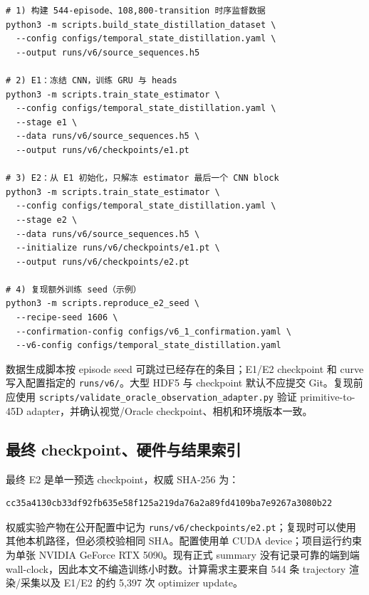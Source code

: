 \begin{Verbatim}[breaklines=true,breakanywhere=true,fontsize=\small]
# 1) 构建 544-episode、108,800-transition 时序监督数据
python3 -m scripts.build_state_distillation_dataset \
  --config configs/temporal_state_distillation.yaml \
  --output runs/v6/source_sequences.h5

# 2) E1：冻结 CNN，训练 GRU 与 heads
python3 -m scripts.train_state_estimator \
  --config configs/temporal_state_distillation.yaml \
  --stage e1 \
  --data runs/v6/source_sequences.h5 \
  --output runs/v6/checkpoints/e1.pt

# 3) E2：从 E1 初始化，只解冻 estimator 最后一个 CNN block
python3 -m scripts.train_state_estimator \
  --config configs/temporal_state_distillation.yaml \
  --stage e2 \
  --data runs/v6/source_sequences.h5 \
  --initialize runs/v6/checkpoints/e1.pt \
  --output runs/v6/checkpoints/e2.pt

# 4) 复现额外训练 seed（示例）
python3 -m scripts.reproduce_e2_seed \
  --recipe-seed 1606 \
  --confirmation-config configs/v6_1_confirmation.yaml \
  --v6-config configs/temporal_state_distillation.yaml
\end{Verbatim}

数据生成脚本按 episode seed 可跳过已经存在的条目；E1/E2 checkpoint 和 curve 写入配置指定的 \texttt{runs/v6/}。大型 HDF5 与 checkpoint 默认不应提交 Git。复现前应使用 \nolinkurl{scripts/validate_oracle_observation_adapter.py} 验证 primitive-to-45D adapter，并确认视觉/Oracle checkpoint、相机和环境版本一致。

\hypertarget{ux6700ux7ec8-checkpointux786cux4ef6ux4e0eux7ed3ux679cux7d22ux5f15}{%
\subsection{最终 checkpoint、硬件与结果索引}\label{ux6700ux7ec8-checkpointux786cux4ef6ux4e0eux7ed3ux679cux7d22ux5f15}}

最终 E2 是单一预选 checkpoint，权威 SHA-256 为：

\begin{Verbatim}[breaklines=true,breakanywhere=true,fontsize=\small]
cc35a4130cb33df92fb635e58f125a219da76a2a89fd4109ba7e9267a3080b22
\end{Verbatim}

权威实验产物在公开配置中记为 \nolinkurl{runs/v6/checkpoints/e2.pt}；复现时可以使用其他本机路径，但必须校验相同 SHA。配置使用单 CUDA device；项目运行约束为单张 NVIDIA GeForce RTX 5090。现有正式 summary 没有记录可靠的端到端 wall-clock，因此本文不编造训练小时数。计算需求主要来自 544 条 trajectory 渲染/采集以及 E1/E2 的约 5,397 次 optimizer update。

